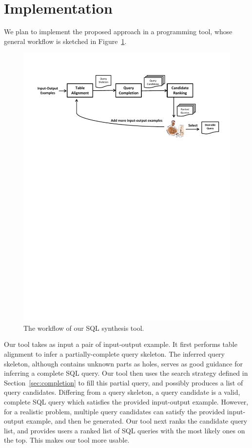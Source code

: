 
\section{Implementation}
\label{sec:implementation}

We plan to implement the proposed approach in a programming
tool, whose general workflow is sketched in Figure~\ref{fig:workflow}.

\begin{figure}[t]
  \centering
  \includegraphics[scale=0.46]{workflow}
  \vspace*{-5.0ex}\caption {{\label{fig:workflow} The workflow of our SQL synthesis tool.
}}
\end{figure}

Our tool takes as input a pair of input-output example. It first performs
table alignment to infer a partially-complete query skeleton. The inferred query
skeleton, although contains unknown parts as holes, serves as good guidance
for inferring a complete SQL query.
Our tool then uses the search strategy defined in Section~\ref{sec:completion}
to fill this partial query, and possibly produces a list of query candidates.
Differing from a query skeleton, a query candidate is a valid, complete SQL query which satisfies
the provided input-output example. However, for a realistic problem,
multiple query candidates can satisfy the provided input-output example, and then be
generated. Our tool next ranks the candidate
query list, and provides users a ranked list of SQL queries with the most likely
ones on the top. This makes our tool more usable.

